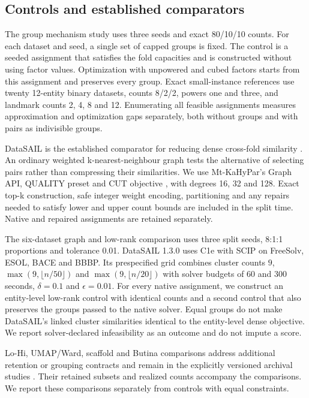 \documentclass[12pt]{article}
\begin{document}
\subsection{Controls and established comparators}

The group mechanism study uses three seeds and exact 80/10/10 counts. For each
dataset and seed, a single set of capped groups is fixed. The control is a
seeded assignment that satisfies the fold capacities and is constructed without
using factor values. Optimization with unpowered and cubed factors starts from
this assignment and preserves every group. Exact small-instance references use
twenty 12-entity binary datasets, counts 8/2/2, powers one and three, and
landmark counts 2, 4, 8 and 12. Enumerating all feasible assignments measures
approximation and optimization gaps separately, both without groups and with
pairs as indivisible groups.

DataSAIL is the established comparator for reducing dense cross-fold similarity
\citep{joeres2025datasail,joeres2026datasailaddendum}. An ordinary weighted
k-nearest-neighbour graph tests the alternative of selecting pairs rather than
compressing their similarities. We use Mt-KaHyPar's Graph API, QUALITY preset
and CUT objective \citep{gottesburen2024}, with degrees 16, 32 and 128. Exact
top-k construction, safe integer weight encoding, partitioning and any repairs
needed to satisfy lower and upper count bounds are included in the split time.
Native and repaired assignments are retained separately.

The six-dataset graph and low-rank comparison uses three split seeds, 8:1:1
proportions and tolerance 0.01. DataSAIL 1.3.0 uses C1e with SCIP on FreeSolv,
ESOL, BACE and BBBP. Its prespecified grid combines cluster counts $9$,
$\max(9,\lfloor n/50\rfloor)$ and $\max(9,\lfloor n/20\rfloor)$ with solver
budgets of 60 and 300 seconds, $\delta=0.1$ and $\epsilon=0.01$. For every
native assignment, we construct an entity-level low-rank control with identical
counts and a second control that also preserves the groups passed to the native
solver. Equal groups do not make DataSAIL's linked cluster similarities
identical to the entity-level dense objective. We report solver-declared
infeasibility as an outcome and do not impute a score.

Lo-Hi, UMAP/Ward, scaffold and Butina comparisons address additional retention
or grouping contracts and remain in the explicitly versioned archival studies
\citep{steshin2023lohi,hernandez2023clustering,guo2025umap,bemis1996frameworks,butina1999clustering}.
Their retained subsets and realized counts accompany the comparisons. We report
these comparisons separately from controls with equal constraints.
\end{document}
